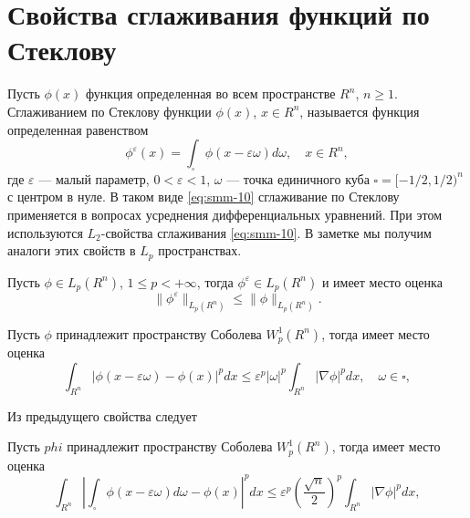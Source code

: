 	
\section{Свойства сглаживания функций по Стеклову}
Пусть $\phi(x)$ функция определенная во всем пространстве  $R^n$, $n\geqslant1$. Сглаживанием по Стеклову функции $\phi(x)$, $x\in R^n$, называется функция определенная равенством
\begin{equation}\label{eq:smm-10}
\phi^\varepsilon (x)=\int_\square \phi(x-\varepsilon \omega)d\omega, \quad   x\in R^n, 
\end{equation}                
где  $\varepsilon$ --- малый параметр,  $0<\varepsilon<1$, $\omega$ --- точка единичного куба $\square=[-1/2,1/2)^n$ с центром в нуле.
В таком виде \eqref{eq:smm-10} сглаживание по Стеклову применяется в вопросах усреднения дифференциальных уравнений. При этом используются $L_2$-свойства сглаживания \eqref{eq:smm-10}. В заметке мы получим аналоги этих свойств в  $L_p$ пространствах.

\begin{property}\label{prop:smm-1}
	Пусть  $\phi\in L_p (R^n)$, $1\leqslant p<+\infty$, тогда 
	$\phi^\varepsilon\in L_p (R^n)$ и имеет место оценка
	$$
	\|\phi^\varepsilon\|_{L_p (R^n )} \leqslant\|\phi\|_{L_p (R^n)}.    
	$$
\end{property}

\begin{property}\label{prop:smm-2}
	Пусть $\phi$ принадлежит пространству Соболева $W_p^1 (R^n)$, тогда имеет место оценка
	$$
	\int_{R^n}|\phi(x-\varepsilon\omega)-\phi(x)|^p  dx \leqslant \varepsilon^p |\omega|^p  \int_{R^n}|\nabla \phi|^p dx,   \quad \omega\in\square,        
	$$
\end{property}


Из предыдущего свойства следует

\begin{property}\label{prop:smm-3}
	Пусть $phi$ принадлежит пространству Соболева $W_p^1 (R^n)$, тогда имеет место оценка
	$$
	\int_{R^n}\left|\int_\square\phi(x-\varepsilon\omega)d\omega-\phi(x)\right|^p  dx \leqslant \varepsilon^p \left(\frac{\sqrt{n}}{2}\right)^p  \int_{R^n}|\nabla \phi|^p dx,         
	$$
\end{property}



